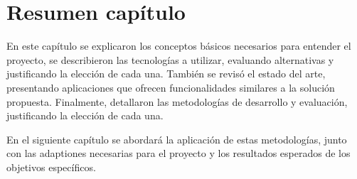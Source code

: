 \section{Resumen capítulo}

En este capítulo se explicaron los conceptos básicos necesarios para entender el proyecto, se describieron las tecnologías a utilizar, evaluando alternativas y justificando la elección de cada una. También se revisó el estado del arte, presentando aplicaciones que ofrecen funcionalidades similares a la solución propuesta. Finalmente, detallaron las metodologías de desarrollo y evaluación, justificando la elección de cada una.

En el siguiente capítulo se abordará la aplicación de estas metodologías, junto con las adaptiones necesarias para el proyecto y los resultados esperados de los objetivos específicos.

